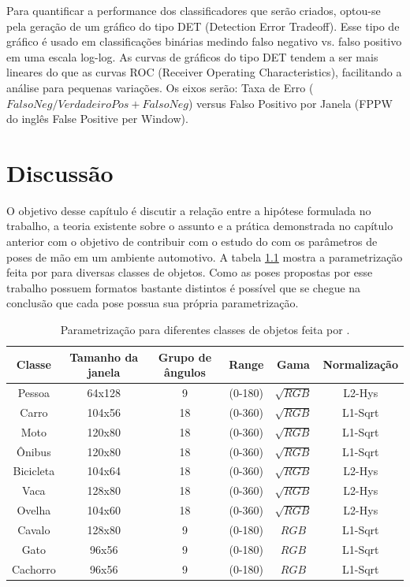 Para quantificar a performance dos classificadores que serão criados, optou-se pela geração de um gráfico do tipo DET (Detection Error Tradeoff). Esse tipo de gráfico é usado em classificações binárias medindo falso negativo vs. falso positivo em uma escala log-log. As curvas de gráficos do tipo DET tendem a ser mais lineares do que as curvas ROC (Receiver Operating Characteristics), facilitando a análise para pequenas variações. Os eixos serão: Taxa de Erro (\(FalsoNeg/VerdadeiroPos + FalsoNeg\)) versus Falso Positivo por Janela (FPPW do inglês False Positive per Window).

\chapter{Discussão}

O objetivo desse capítulo é discutir a relação entre a hipótese formulada no trabalho, a teoria existente sobre o assunto e a prática demonstrada no capítulo anterior com o objetivo de contribuir com o estudo do  com os parâmetros de poses de mão em um ambiente automotivo. A tabela \ref{table:key_hog} mostra a parametrização feita por  para diversas classes de objetos.
Como as poses propostas por esse trabalho possuem formatos bastante distintos é possível que se chegue na conclusão que cada pose possua sua própria parametrização.

\begin{table}[H]
	\centering
	\begin{tabular}{|c|c|c|c|c|c|}
	\hline
		Classe & Tamanho da janela & Grupo de ângulos & Range & Gama & Normalização \\
	\hline  
		Pessoa & 64x128 & 9 & (0-180\degree) & \(\sqrt{RGB}\) & L2-Hys \\
	\hline  
		Carro & 104x56 & 18 & (0-360\degree) & \(\sqrt{RGB}\) & L1-Sqrt \\
	\hline  
		Moto & 120x80 & 18 & (0-360\degree) & \(\sqrt{RGB}\) & L1-Sqrt \\
	\hline  
		Ônibus & 120x80 & 18 & (0-360\degree) & \(\sqrt{RGB}\) & L1-Sqrt \\
	\hline  
		Bicicleta & 104x64 & 18 & (0-360\degree) & \(\sqrt{RGB}\) & L2-Hys \\
	\hline  
		Vaca & 128x80 & 18 & (0-360\degree) & \(\sqrt{RGB}\) & L2-Hys \\
	\hline  
		Ovelha & 104x60 & 18 & (0-360\degree) & \(\sqrt{RGB}\) & L2-Hys \\
	\hline  
		Cavalo & 128x80 & 9 & (0-180\degree) & \(RGB\) & L1-Sqrt \\
	\hline  
		Gato & 96x56 & 9 & (0-180\degree) & \(RGB\) & L1-Sqrt \\
	\hline  
		Cachorro & 96x56 & 9 & (0-180\degree) & \(RGB\) & L1-Sqrt \\
	\hline		
	\end{tabular} 
	\caption{Parametrização  para diferentes classes de objetos feita por \cite{dalal2006finding}.}
	\label{table:key_hog}
\end{table}

